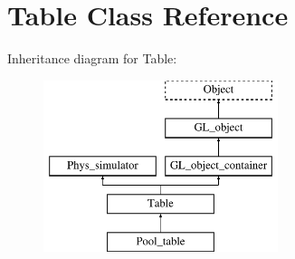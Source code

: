 \hypertarget{class_table}{
\section{Table Class Reference}
\label{class_table}
}
Inheritance diagram for Table:\begin{figure}[H]
\begin{center}
\leavevmode
\includegraphics[height=5.000000cm]{class_table}
\end{center}
\end{figure}
